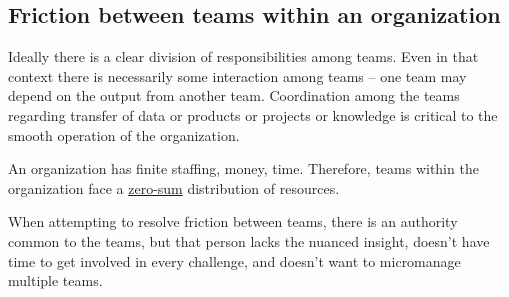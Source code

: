 \subsection{Friction between teams within an organization}

Ideally there is a clear division of responsibilities among teams. Even in that context there is necessarily some interaction among teams -- one team may depend on the output from another team. Coordination among the teams regarding transfer of data or products or projects or knowledge is critical to the smooth operation of the organization. 

An organization has finite staffing, money, time. Therefore, teams within the organization face a \href{https://en.wikipedia.org/wiki/Zero-sum_game}{zero-sum} distribution of resources.

When attempting to resolve friction between teams, there is an authority common to the teams, but that person lacks the nuanced insight, doesn't have time to get involved in every challenge, and doesn't want to micromanage multiple teams.